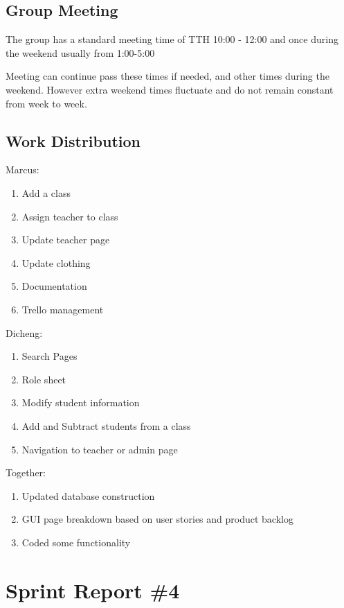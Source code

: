 \subsection{Group Meeting}

The group has a standard meeting time of TTH 10:00 - 12:00 and once during the weekend usually from 1:00-5:00 

Meeting can continue pass these times if needed, and other times during the weekend. However extra weekend times fluctuate and do not remain constant from week to week. 

\subsection{Work Distribution}

Marcus:
\begin{enumerate}
\item Add a class
\item Assign teacher to class
\item Update teacher page
\item Update clothing
\item Documentation
\item Trello management\\
\end{enumerate}

Dicheng:
\begin{enumerate}
\item Search Pages
\item Role sheet
\item Modify student information
\item Add and Subtract students from a class
\item Navigation to teacher or admin page\\
\end{enumerate}


Together:
\begin{enumerate}
\item Updated database construction
\item GUI page breakdown based on user stories and product backlog
\item Coded some functionality
\end{enumerate}

\section{Sprint Report \#4}

